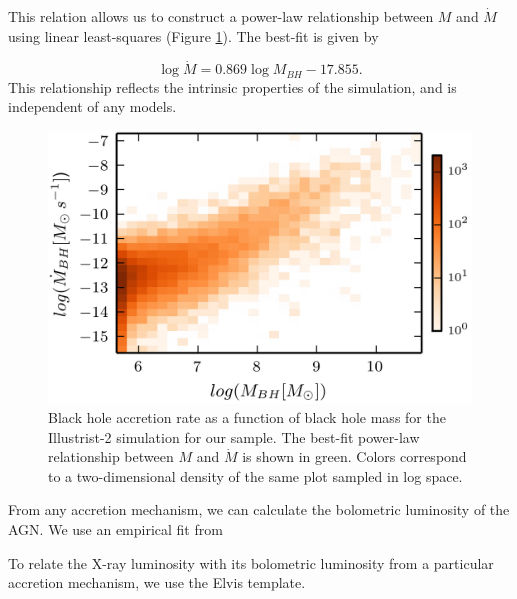 This relation allows us to construct a power-law
relationship between $M$ and $\dot{M}$ using linear least-squares
(Figure \ref{fig:bhpop_hist2d}). The best-fit is given by

\begin{equation}
\log\dot{M}=0.869\log M_{BH}-17.855.\label{eq:int_relation}
\end{equation}
This relationship reflects the intrinsic properties of the simulation,
and is independent of any models.


\begin{figure}
\centering{}\includegraphics[clip]{Figures/Illustris2_bhpop_hist2d}
\protect\caption{\label{fig:bhpop_hist2d}Black hole accretion rate as a function of
black hole mass for the Illustrist-2 simulation for our sample. The
best-fit power-law relationship between $M$ and $\dot{M}$ is shown
in green. Colors correspond to a two-dimensional density of the same
plot sampled in log space.}
\end{figure}


From any accretion mechanism, we can calculate the bolometric
luminosity of the AGN. We use an empirical fit from 

To relate the X-ray luminosity with its bolometric luminosity from a particular accretion mechanism,
we use the Elvis template\citep{elvis1994atlasof}.
